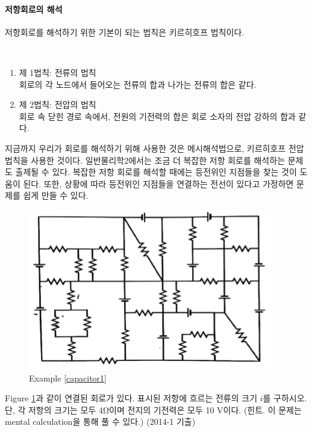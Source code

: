 \paragraph{저항회로의 해석}
저항회로를 해석하기 위한 기본이 되는 법칙은 키르히호프 법칙이다.
\begin{theorem}[키르히호프 법칙]\\
\begin{enumerate}
\item 제 1법칙: 전류의 법칙\\회로의 각 노드에서 들어오는 전류의 합과 나가는 전류의 합은 같다.
\item 제 2법칙: 전압의 법칙\\회로 속 닫힌 경로 속에서, 전원의 기전력의 합은 회로 소자의 전압 강하의 합과 같다.
\end{enumerate}
\end{theorem}
지금까지 우리가 회로를 해석하기 위해 사용한 것은 메시해석법으로, 키르히호프 전압 법칙을 사용한 것이다. 일반물리학2에서는 조금 더 복잡한 저항 회로를 해석하는 문제도 출제될 수 있다. 복잡한 저항 회로를 해석할 때에는 등전위인 지점들을 찾는 것이 도움이 된다. 또한, 상황에 따라 등전위인 지점들을 연결하는 전선이 있다고 가정하면 문제를 쉽게 만들 수 있다.
\begin{figure}[h]
\centering\includegraphics[scale=0.6]{Pictures/capacitor1.PNG}
\caption{Example \ref{capacitor1}}
\label{fig:capacitor1}
\end{figure}
\begin{exercise}\label{capacitor1}
Figure \ref{fig:capacitor1}과 같이 연결된 회로가 있다. 표시된 저항에 흐르는 전류의 크기 $i$를 구하시오. 단, 각 저항의 크기는 모두 4Ω이며 전지의 기전력은 모두 10 V이다. (힌트. 이 문제는 mental calculation을 통해 풀 수 있다.)
(2014-1 기출)
\end{exercise}

